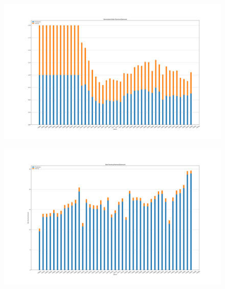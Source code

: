 \documentclass[12pt]{article}
\begin{document}
    \begin{figure}
        \includegraphics[width=\linewidth]{../data/figs/Normalized Dollar Revenue-Balanced.png}
    \end{figure}
    \begin{figure}
        \includegraphics[width=\linewidth]{../data/figs/Real Revenue(Hemat)-Balanced.png}
    \end{figure}


\end{document}
